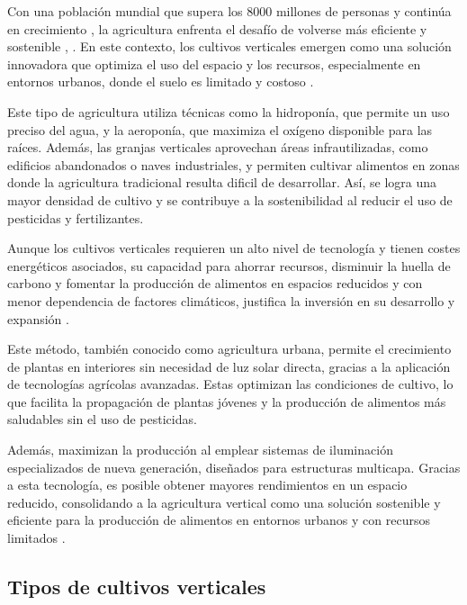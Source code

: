 Con una población mundial que supera los 8000 millones de personas y continúa en crecimiento \cite{PEOPLE}, la agricultura enfrenta el desafío de volverse más eficiente y sostenible \cite{AGUA}, \cite{FAO}. En este contexto, los cultivos verticales emergen como una solución innovadora que optimiza el uso del espacio y los recursos, especialmente en entornos urbanos, donde el suelo es limitado y costoso \cite{SANTANDER}.

Este tipo de agricultura utiliza técnicas como la hidroponía, que permite un uso preciso del agua, y la aeroponía, que maximiza el oxígeno disponible para las raíces. Además, las granjas verticales aprovechan áreas infrautilizadas, como edificios abandonados o naves industriales, y permiten cultivar alimentos en zonas donde la agricultura tradicional resulta dificil de desarrollar. Así, se logra una mayor densidad de cultivo y se contribuye a la sostenibilidad al reducir el uso de pesticidas y fertilizantes.

Aunque los cultivos verticales requieren un alto nivel de tecnología y tienen costes energéticos asociados, su capacidad para ahorrar recursos, disminuir la huella de carbono y fomentar la producción de alimentos en espacios reducidos y con menor dependencia de factores climáticos, justifica la inversión en su desarrollo y expansión \cite{alhwarin2020vertical}.

Este método, también conocido como agricultura urbana, permite el crecimiento de plantas en interiores sin necesidad de luz solar directa, gracias a la aplicación de tecnologías agrícolas avanzadas. Estas optimizan las condiciones de cultivo, lo que facilita la propagación de plantas jóvenes y la producción de alimentos más saludables sin el uso de pesticidas.

Además, maximizan la producción al emplear sistemas de iluminación especializados de nueva generación, diseñados para estructuras multicapa. Gracias a esta tecnología, es posible obtener mayores rendimientos en un espacio reducido, consolidando a la agricultura vertical como una solución sostenible y eficiente para la producción de alimentos en entornos urbanos y con recursos limitados \cite{SANTANDER}.

\subsection{Tipos de cultivos verticales}


